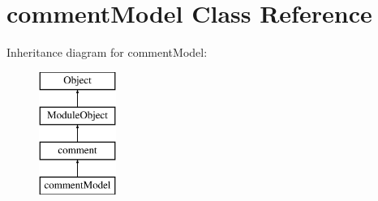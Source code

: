 \hypertarget{classcommentModel}{\section{comment\+Model Class Reference}
\label{classcommentModel}
}
Inheritance diagram for comment\+Model\+:\begin{figure}[H]
\begin{center}
\leavevmode
\includegraphics[height=4.000000cm]{classcommentModel}
\end{center}
\end{figure}
